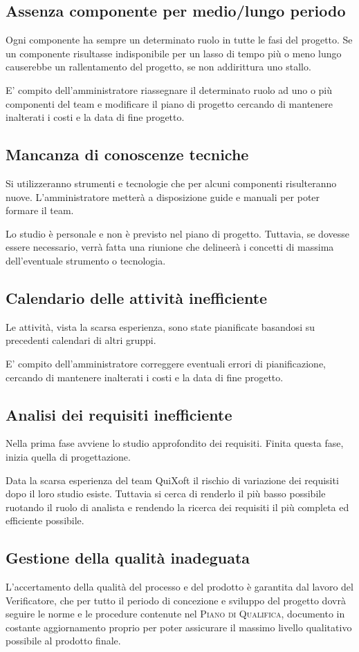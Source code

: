 \documentclass[11pt,a4paper]{article}
\begin{document}
\subsection{Assenza componente per medio/lungo periodo}
Ogni componente ha sempre un determinato ruolo in tutte le fasi del progetto.
Se un componente risultasse indisponibile per un lasso di tempo più o meno lungo causerebbe un rallentamento del progetto, se non addirittura uno stallo.

E' compito dell'amministratore riassegnare il determinato ruolo ad uno o più componenti del team e modificare il piano di progetto cercando di mantenere inalterati i costi e la data di fine progetto.
\subsection{Mancanza di conoscenze tecniche}
Si utilizzeranno strumenti e tecnologie che per alcuni componenti risulteranno nuove.
L'amministratore metterà a disposizione guide e manuali per poter formare il team.

Lo studio è personale e non è previsto nel piano di progetto.
Tuttavia, se dovesse essere necessario, verrà fatta una riunione che delineerà i concetti di massima dell'eventuale strumento o tecnologia.
\subsection{Calendario delle attività inefficiente}
Le attività, vista la scarsa esperienza, sono state pianificate basandosi su precedenti calendari di altri gruppi.

E' compito dell'amministratore correggere eventuali errori di pianificazione, cercando di mantenere inalterati i costi e la data di fine progetto.
\subsection{Analisi dei requisiti inefficiente}
Nella prima fase avviene lo studio approfondito dei requisiti.
Finita questa fase, inizia quella di progettazione.

Data la scarsa esperienza del team QuiXoft il rischio di variazione dei requisiti dopo il loro studio esiste. Tuttavia si cerca di renderlo il più basso possibile ruotando il ruolo di analista e rendendo la ricerca dei requisiti il più completa ed efficiente possibile.
\subsection{Gestione della qualità inadeguata}
L'accertamento della qualità del processo e del prodotto è garantita dal lavoro del Verificatore, che per tutto il periodo di concezione e sviluppo del progetto dovrà seguire le norme e le procedure contenute nel \textsc{Piano di Qualifica}, documento in costante aggiornamento proprio per poter assicurare il massimo livello qualitativo possibile al prodotto finale.
\end{document}
